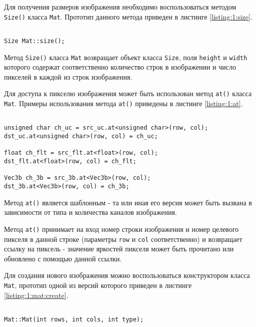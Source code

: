 Для получения размеров изображения необходимо воспользоваться методом \verb|Size()| класса \verb|Mat|. Прототип данного метода приведен в листинге \ref{listing:1:size}.

\begin{lstlisting}

Size Mat::size();

\end{lstlisting}
\mylistingend

Метод \verb|Size()| класса \verb|Mat| возвращает объект класса \verb|Size|, поля \verb|height| и \verb|width| которого содержат соответственно количество строк в изображении и число пикселей в каждой из строк изображения.

Для доступа к пикселю изображения может быть использован метод \verb|at()| класса \verb|Mat|. Примеры использования метода \verb|at()| приведены в листинге \ref{listing:1:at}.

\begin{lstlisting}

unsigned char ch_uc = src_uc.at<unsigned char>(row, col);
dst_uc.at<unsigned char>(row, col) = ch_uc;

float ch_flt = src_flt.at<float>(row, col);
dst_flt.at<float>(row, col) = ch_flt;

Vec3b ch_3b = src_3b.at<Vec3b>(row, col);
dst_3b.at<Vec3b>(row, col) = ch_3b;

\end{lstlisting}
\mylistingend

Метод \verb|at()| является шаблонным - та или иная его версия может быть вызвана в зависимости от типа и количества каналов изображения.

Метод \verb|at()| принимает на вход номер строки изображения и номер целевого пикселя в данной строке (параметры \verb|row| и \verb|col| соответственно) и возвращает ссылку на пиксель - значение яркостей пикселя может быть прочитано или обновлено с помощью данной ссылки.


Для создания нового изображения можно воспользоваться конструктором класса \verb|Mat|, прототип одной из версий которого приведен в листинге \ref{listing:1:mat:create}.

\begin{lstlisting}

Mat::Mat(int rows, int cols, int type);

\end{lstlisting}
\mylistingend

